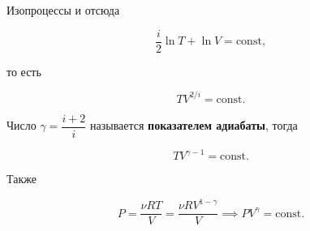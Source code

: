 \documentclass{article}
\newcommand{\const}{\mathrm{const}}
\begin{document}
\begin{section}{Изопроцессы}
		и отсюда

		\begin{equation*}
			\frac{i}{2} \ln T + \ln V = \const,
		\end{equation*}

		то есть

		\begin{equation*}
			TV^{2/i} = \const.
		\end{equation*}

		Число $\gamma = \dfrac{i + 2}{i}$ называется \textbf{показателем адиабаты}, тогда

		\begin{equation*}
			TV^{\gamma - 1} = \const.
		\end{equation*}

		Также

		\begin{equation*}
			P = \frac{\nu RT}{V} = \frac{\nu R V^{1 - \gamma}}{V} \implies PV^\gamma = \const.
		\end{equation*}
	\end{section}
\end{document}
